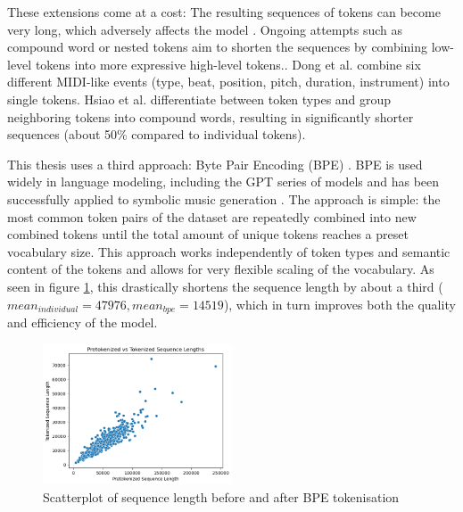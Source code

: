These extensions come at a cost: The resulting sequences of tokens can become very long, which adversely affects the model \cite{Ji_Yang_Luo_survey_symbolic_2024}. Ongoing attempts such as compound word or nested tokens aim to shorten the sequences by combining low-level tokens into more expressive high-level tokens.\cite{Ryu_Dong_nested_2024}. Dong et al. \cite{Dong_Chen_MMT_Kirkpatrick_2023} combine six different MIDI-like events (type, beat, position, pitch, duration, instrument) into single tokens. Hsiao et al. \cite{compound_word_Hsiao_Liu_Yeh_Yang_2021} differentiate between token types and group neighboring tokens into compound words, resulting in significantly shorter sequences (about 50\% compared to individual tokens). 

This thesis uses a third approach: Byte Pair Encoding (BPE) \cite{Sennrich_Haddow_Birch_BPE_2016}. BPE is used widely in language modeling, including the GPT series of models \cite{Radford_Wu_Child_Luan_gpt2_2019} and has been successfully applied to symbolic music generation \cite{Fradet_Gutowski_Chhel_Briot_2023}. The approach is simple: the most common token pairs of the dataset are repeatedly combined into new combined tokens until the total amount of unique tokens reaches a preset vocabulary size. This approach works independently of token types and semantic content of the tokens and allows for very flexible scaling of the vocabulary. As seen in figure \ref{fig:tok_compare}, this drastically shortens the sequence length by about a third ($mean_{individual}=47976, mean_{bpe}=14519$), which in turn improves both the quality and efficiency of the model. 


\begin{figure}[H]
    \centering
    \includegraphics[width=0.5\textwidth]{IMAGES/scatter_pre_post_tok.png} 
    \caption{Scatterplot of sequence length before and after BPE tokenisation}
    \label{fig:tok_compare}
\end{figure}
